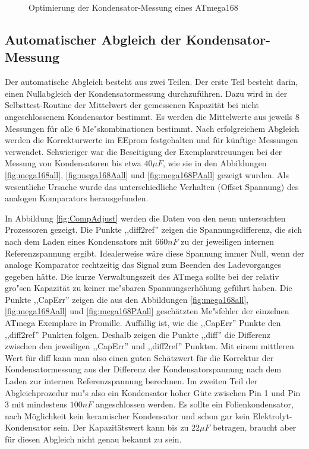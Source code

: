 \begin{figure}[H]
\centering

\caption{Optimierung der Kondensator-Messung eines ATmega168}
\label{fig:mega168optcap}
\end{figure}

\subsection{Automatischer Abgleich der Kondensator-Messung}

Der automatische Abgleich besteht aus zwei Teilen. Der erste Teil besteht darin, einen Nullabgleich der Kondensatormessung durchzuf\"uhren.
Dazu wird in der Selbsttest-Routine der Mittelwert der gemessenen Kapazit\"at bei nicht angeschlossenem Kondensator bestimmt.
Es werden die Mittelwerte aus jeweils 8 Messungen f\"ur alle 6 Me"skombinationen bestimmt.
Nach erfolgreichem Abgleich werden die Korrekturwerte im EEprom festgehalten und f\"ur k\"unftige Messungen verwendet.
Schwieriger war die Beseitigung der Exemplarstreuungen bei der Messung von Kondensatoren bis etwa \(40 \mu F\), wie sie in den 
Abbildungen \ref{fig:mega168all}, \ref{fig:mega168Aall} und \ref{fig:mega168PAall} gezeigt wurden.
Als wesentliche Ursache wurde das unterschiedliche Verhalten (Offset Spannung) des analogen Komparators herausgefunden.

In Abbildung \ref{fig:CompAdjust} werden die Daten von den neun untersuchten Prozessoren gezeigt.
Die Punkte ,,diff2ref'' zeigen die Spannungsdifferenz, die sich nach dem Laden eines Kondensators mit \(660 nF\) zu der
jeweiligen internen Referenzspannung ergibt. Idealerweise w\"are diese Spannung immer Null, wenn der analoge
Komparator rechtzeitig das Signal zum Beenden des Ladevorganges gegeben h\"atte. Die kurze Verwaltungszeit des ATmega
sollte bei der relativ gro"sen Kapazit\"at zu keiner me"sbaren Spannungserh\"ohung gef\"uhrt haben.
Die Punkte ,,CapErr'' zeigen die aus den Abbildungen \ref{fig:mega168all}, \ref{fig:mega168Aall} und \ref{fig:mega168PAall} 
gesch\"atzten Me"sfehler der einzelnen ATmega Exemplare in Promille.
Auff\"allig ist, wie die ,,CapErr'' Punkte den ,,diff2ref'' Punkten folgen.
Deshalb zeigen die Punkte ,,diff'' die Differenz zwischen den jeweiligen ,,CapErr'' und ,,diff2ref'' Punkten.
Mit einem mittleren Wert f\"ur diff kann man also einen guten Sch\"atzwert f\"ur die Korrektur der Kondensatormessung aus der
Differenz der Kondensatorspannung nach dem Laden zur internen Referenzspannung berechnen.
Im zweiten Teil der Abgleichprozedur mu"s also ein Kondensator hoher G\"ute zwischen Pin 1 und Pin 3 mit mindestens \(100 nF\)
angeschlossen werden. Es sollte ein Folienkondensator, nach M\"oglichkeit kein keramischer Kondensator und schon gar kein
Elektrolyt-Kondensator sein. Der Kapazit\"atswert kann bis zu \(22 \mu F\) betragen,
braucht aber f\"ur diesen Abgleich nicht genau bekannt zu sein.

